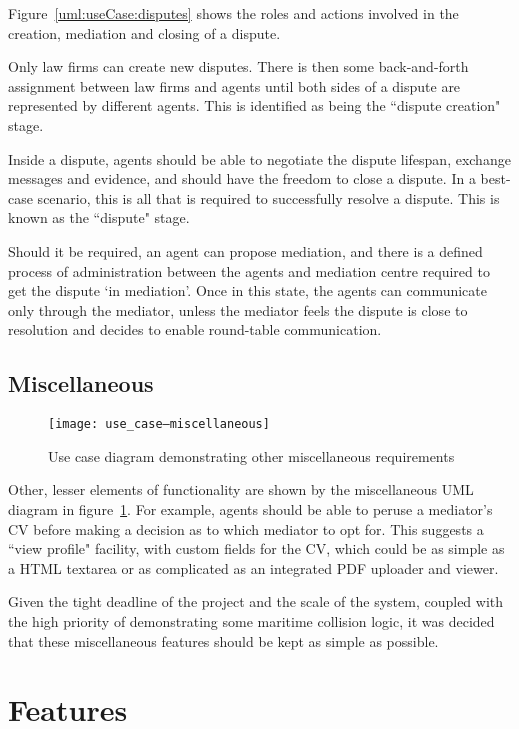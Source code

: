 Figure~\ref{uml:useCase:disputes} shows the roles and actions involved in the creation, mediation and closing of a dispute.

Only law firms can create new disputes. There is then some back-and-forth assignment between law firms and agents until both sides of a dispute are represented by different agents. This is identified as being the ``dispute creation" stage.

Inside a dispute, agents should be able to negotiate the dispute lifespan, exchange messages and evidence, and should have the freedom to close a dispute. In a best-case scenario, this is all that is required to successfully resolve a dispute. This is known as the ``dispute" stage.

Should it be required, an agent can propose mediation, and there is a defined process of administration between the agents and mediation centre required to get the dispute `in mediation'. Once in this state, the agents can communicate only through the mediator, unless the mediator feels the dispute is close to resolution and decides to enable round-table communication.

\subsection{Miscellaneous}

\begin{figure}[h!]
  \centering
    \texttt{[image: use\_case--miscellaneous]}
  \caption{Use case diagram demonstrating other miscellaneous requirements}
  \label{uml:useCase:miscellaneous}
\end{figure}

Other, lesser elements of functionality are shown by the miscellaneous UML diagram in figure~\ref{uml:useCase:miscellaneous}. For example, agents should be able to peruse a mediator's CV before making a decision as to which mediator to opt for. This suggests a ``view profile" facility, with custom fields for the CV, which could be as simple as a HTML textarea or as complicated as an integrated PDF uploader and viewer.

Given the tight deadline of the project and the scale of the system, coupled with the high priority of demonstrating some maritime collision logic, it was decided that these miscellaneous features should be kept as simple as possible.

\section{Features}

